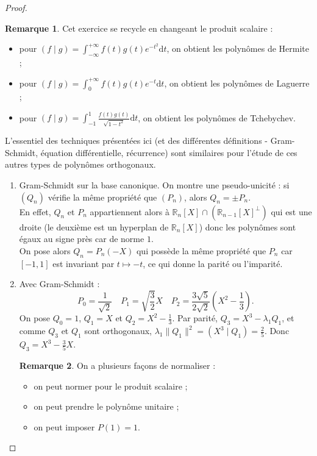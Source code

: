 \documentclass[french]{article}
\newcommand{\R}{\mathbb{R}}
\renewcommand{\d}{\text{d}}
\theoremstyle{definition}
\newtheorem*{rmq}{Remarque}
\begin{document}
\begin{proof}
	\begin{rmq}
		Cet exercice se recycle en changeant le produit scalaire :
		\begin{itemize}
			\item pour $(f\mid g)=\displaystyle\int_{-\infty}^{+\infty}f(t)g(t)e^{-t^2}\d t$, on obtient les polynômes de Hermite ;
			\item pour $(f\mid g)=\displaystyle\int_{0}^{+\infty}f(t)g(t)e^{-t}\d t$, on obtient les polynômes de Laguerre ;
			\item pour $(f\mid g)=\displaystyle\int_{-1}^{1}\frac{f(t)g(t)}{\sqrt{1-t^2}}\d t$, on obtient les polynômes de Tchebychev.
		\end{itemize}
		L'essentiel des techniques présentées ici (et des différentes définitions - Gram-Schmidt, équation différentielle, récurrence) sont similaires pour l'étude de ces autres types de polynômes orthogonaux.
	\end{rmq}
	\begin{enumerate}
		\item Gram-Schmidt sur la base canonique. On montre une pseudo-unicité : si $(Q_n)$ vérifie la même propriété que $(P_n)$, alors $Q_n=\pm P_n$. \\
		En effet, $Q_n$ et $P_n$ appartiennent alors à $\R_n[X]\cap\left(\R_{n-1}[X]^\bot\right)$ qui est une droite (le deuxième est un hyperplan de $\R_n[X]$) donc les polynômes sont égaux au signe près car de norme $1$.\\
		On pose alors $Q_n=P_n(-X)$ qui possède la même propriété que $P_n$ car $[-1,1]$ est invariant par $t\mapsto -t$, ce qui donne la parité ou l'imparité.
		\item Avec Gram-Schmidt :
		$$P_0=\frac{1}{\sqrt{2}}\quad P_1=\sqrt{\frac{3}{2}}X\quad P_2=\frac{3\sqrt{5}}{2\sqrt{2}}\left(X^2-\frac{1}{3}\right).$$
		On pose $Q_0=1$, $Q_1=X$ et $Q_2=\displaystyle X^2-\frac{1}{3}$. Par parité, $Q_3=X^3-\lambda_1Q_1$, et comme $Q_3$ et $Q_1$ sont orthogonaux, $\lambda_1\lVert Q_1\rVert^2=(X^3\mid Q_1)=\displaystyle\frac{2}{5}$. Donc $\displaystyle Q_3=X^3-\frac{3}{5}X$.
		\begin{rmq}
			On a plusieurs façons de normaliser :
			\begin{itemize}
				\item on peut normer pour le produit scalaire ;
				\item on peut prendre le polynôme unitaire ;
				\item on peut imposer $P(1)=1$.
			\end{itemize}

\end{rmq}
\end{enumerate}
\end{proof}
\end{document}
